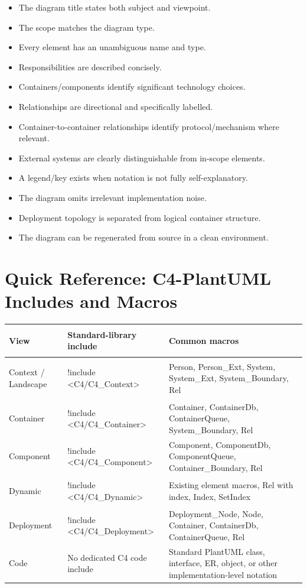 \documentclass[11pt]{article}
\begin{document}
\begin{itemize}
  \item The diagram title states both subject and viewpoint.
  \item The scope matches the diagram type.
  \item Every element has an unambiguous name and type.
  \item Responsibilities are described concisely.
  \item Containers/components identify significant technology choices.
  \item Relationships are directional and specifically labelled.
  \item Container-to-container relationships identify protocol/mechanism where relevant.
  \item External systems are clearly distinguishable from in-scope elements.
  \item A legend/key exists when notation is not fully self-explanatory.
  \item The diagram omits irrelevant implementation noise.
  \item Deployment topology is separated from logical container structure.
  \item The diagram can be regenerated from source in a clean environment.
\end{itemize}

\section{Quick Reference: C4-PlantUML Includes and Macros}

\begin{tabularx}{\textwidth}{>{\bfseries\raggedright\arraybackslash}p{} >{\ttfamily\raggedright\arraybackslash}p{} X}
\toprule
View & Standard-library include & Common macros \\
\midrule
Context / Landscape & !include <C4/C4\_Context> & Person, Person\_Ext, System, System\_Ext, System\_Boundary, Rel \\
Container & !include <C4/C4\_Container> & Container, ContainerDb, ContainerQueue, System\_Boundary, Rel \\
Component & !include <C4/C4\_Component> & Component, ComponentDb, ComponentQueue, Container\_Boundary, Rel \\
Dynamic & !include <C4/C4\_Dynamic> & Existing element macros, Rel with index, Index, SetIndex \\
Deployment & !include <C4/C4\_Deployment> & Deployment\_Node, Node, Container, ContainerDb, ContainerQueue, Rel \\
Code & No dedicated C4 code include & Standard PlantUML class, interface, ER, object, or other implementation-level notation \\
\bottomrule
\end{tabularx}
\end{document}
